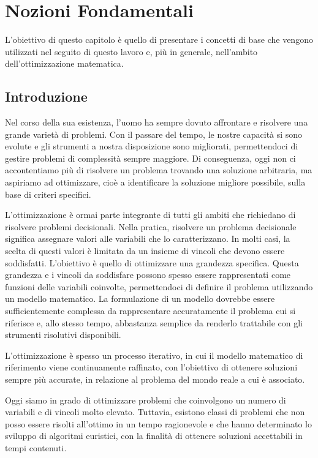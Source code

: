 \chapter{Nozioni Fondamentali}

L'obiettivo di questo capitolo è quello di presentare i concetti di base che vengono utilizzati nel seguito di questo
lavoro e, più in generale, nell'ambito dell'ottimizzazione matematica.

\section{Introduzione}
Nel corso della sua esistenza, l’uomo ha sempre dovuto affrontare e risolvere una grande varietà di problemi. Con il
passare del tempo, le nostre capacità si sono evolute e gli strumenti a nostra disposizione sono migliorati,
permettendoci di gestire problemi di complessità sempre maggiore. Di conseguenza, oggi non ci accontentiamo più di
risolvere un problema trovando una soluzione arbitraria, ma aspiriamo ad ottimizzare, cioè a identificare la soluzione
migliore possibile, sulla base di criteri specifici.

L'ottimizzazione è ormai parte integrante di tutti gli ambiti che richiedano di risolvere problemi decisionali. Nella
pratica, risolvere un problema decisionale significa assegnare valori alle variabili che lo caratterizzano. In molti
casi, la scelta di questi valori è limitata da un insieme di vincoli che devono essere soddisfatti. L'obiettivo è quello
di ottimizzare una grandezza specifica. Questa grandezza e i vincoli da soddisfare possono spesso essere rappresentati
come funzioni delle variabili coinvolte, permettendoci di definire il problema utilizzando un modello matematico. La
formulazione di un modello dovrebbe essere sufficientemente complessa da rappresentare accuratamente il problema cui si
riferisce e, allo stesso tempo, abbastanza semplice da renderlo trattabile con gli strumenti risolutivi disponibili.

L'ottimizzazione è spesso un processo iterativo, in cui il modello matematico di riferimento viene continuamente
raffinato, con l'obiettivo di ottenere soluzioni sempre più accurate, in relazione al problema del mondo reale a cui è
associato.

Oggi siamo in grado di ottimizzare problemi che coinvolgono un numero di variabili e di vincoli molto elevato. Tuttavia,
esistono classi di problemi che non posso essere risolti all'ottimo in un tempo ragionevole e che hanno determinato lo
sviluppo di algoritmi euristici, con la finalità di ottenere soluzioni accettabili in tempi contenuti.


